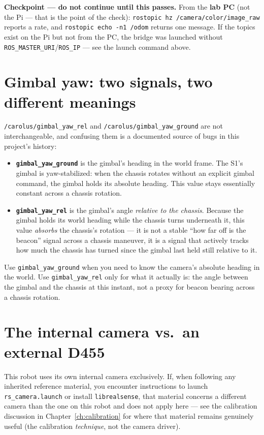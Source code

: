 \documentclass[11pt]{report}
\newenvironment{warningbox}%
  {\begin{lrbox}{\warnbox}\begin{minipage}{0.90\textwidth}}%
  {\end{minipage}\end{lrbox}%
   \begin{center}\fcolorbox{black}{codebg}{\usebox{\warnbox}}\end{center}}
\begin{document}
\begin{warningbox}
\textbf{Checkpoint --- do not continue until this passes.} From the
\textbf{lab PC} (not the Pi --- that is the point of the check):
\texttt{rostopic hz /camera/color/image\_raw} reports a rate, and
\texttt{rostopic echo -n1 /odom} returns one message. If the topics exist on
the Pi but not from the PC, the bridge was launched without
\texttt{ROS\_MASTER\_URI}/\texttt{ROS\_IP} --- see the launch command above.
\end{warningbox}

\section{Gimbal yaw: two signals, two different meanings}

\texttt{/carolus/gimbal\_yaw\_rel} and \texttt{/carolus/gimbal\_yaw\_ground}
are not interchangeable, and confusing them is a documented source of bugs
in this project's history:

\begin{itemize}
  \item \textbf{\texttt{gimbal\_yaw\_ground}} is the gimbal's heading in the
  world frame. The S1's gimbal is yaw-stabilized: when the chassis rotates
  without an explicit gimbal command, the gimbal holds its absolute heading.
  This value stays essentially constant across a chassis rotation.
  \item \textbf{\texttt{gimbal\_yaw\_rel}} is the gimbal's angle
  \emph{relative to the chassis}. Because the gimbal holds its world heading
  while the chassis turns underneath it, this value \emph{absorbs} the
  chassis's rotation --- it is not a stable ``how far off is the beacon''
  signal across a chassis maneuver, it is a signal that actively tracks how
  much the chassis has turned since the gimbal last held still relative to
  it.
\end{itemize}

Use \texttt{gimbal\_yaw\_ground} when you need to know the camera's absolute
heading in the world. Use \texttt{gimbal\_yaw\_rel} only for what it
actually is: the angle between the gimbal and the chassis at this instant,
not a proxy for beacon bearing across a chassis rotation.

\section{The internal camera vs.\ an external D455}

This robot uses its own internal camera exclusively. If, when following any
inherited reference material, you encounter instructions to launch
\texttt{rs\_camera.launch} or install \texttt{librealsense}, that material
concerns a different camera than the one on this robot and does not apply
here --- see the calibration discussion in Chapter~\ref{ch:calibration} for
where that material remains genuinely useful (the calibration
\emph{technique}, not the camera driver).
\end{document}
